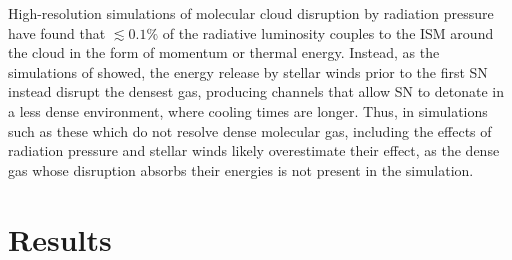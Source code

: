 High-resolution simulations of molecular cloud
disruption by radiation pressure \citep{Dale2005,Gendelev2012,Walch2012} have
found that $\lesssim 0.1\%$ of the radiative luminosity couples to the ISM around
the cloud in the form of momentum or thermal energy.  Instead, as the
simulations of \citet{Rogers2013} showed, the energy release by stellar winds
prior to the first SN instead disrupt the densest gas,
producing channels that allow SN to detonate in a less dense environment, where
cooling times are longer.  Thus, in simulations such as these which do not
resolve dense molecular gas, including the effects of radiation pressure and
stellar winds likely overestimate their effect, as the dense gas 
whose disruption absorbs their energies is not present in the simulation.

\section{Results}

